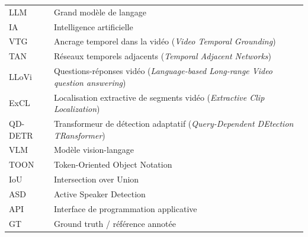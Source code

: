 \small
\begin{longtable}{p{}p{}}
LLM & Grand mod\`ele de langage \\
IA & Intelligence artificielle \\
VTG & Ancrage temporel dans la vid\'eo (\textit{Video Temporal Grounding}) \\
TAN & R\'eseaux temporels adjacents (\textit{Temporal Adjacent Networks}) \\
LLoVi & Questions-r\'eponses vid\'eo (\textit{Language-based Long-range Video question answering}) \\
ExCL & Localisation extractive de segments vid\'eo (\textit{Extractive Clip Localization}) \\
QD-DETR & Transformeur de d\'etection adaptatif (\textit{Query-Dependent DEtection TRansformer}) \\
VLM & Mod\`ele vision-langage \\
TOON & Token-Oriented Object Notation \\
IoU & Intersection over Union \\
ASD & Active Speaker Detection \\
API & Interface de programmation applicative \\
GT & Ground truth / r\'ef\'erence annot\'ee \\
\end{longtable}
